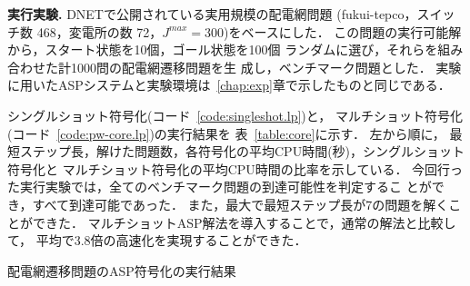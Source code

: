 \textbf{実行実験.}
%
DNETで公開されている実用規模の配電網問題
({\sf fukui-tepco}，スイッチ数 468，変電所の数 72，$J^{max}=300$)をベースにした．
この問題の実行可能解から，スタート状態を10個，ゴール状態を100個
ランダムに選び，それらを組み合わせた計1000問の配電網遷移問題を生
成し，ベンチマーク問題とした．
実験に用いたASPシステムと実験環境は~\ref{chap:exp}章で示したものと同じである．

シングルショット符号化(コード~\ref{code:singleshot.lp})と，
マルチショット符号化(コード~\ref{code:pw-core.lp})の実行結果を
表~\ref{table:core}に示す．
左から順に，
最短ステップ長，解けた問題数，各符号化の平均CPU時間(秒)，シングルショット符号化と
マルチショット符号化の平均CPU時間の比率を示している．
今回行った実行実験では，全てのベンチマーク問題の到達可能性を判定するこ
とができ，すべて到達可能であった．
また，最大で最短ステップ長が7の問題を解くことができた．
マルチショットASP解法を導入することで，通常の解法と比較して，
平均で3.8倍の高速化を実現することができた．

\begin{table*}[t]
  \centering
  \caption{配電網遷移問題のASP符号化の実行結果}
  \label{table:core}
  
\end{table*}


